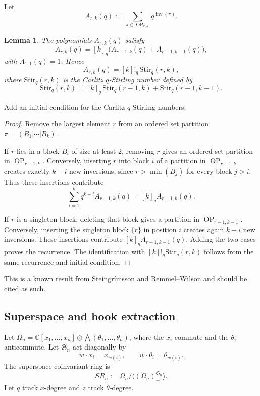 \documentclass[12pt]{article}
\newtheorem{lemma}[theorem]{Lemma}
\DeclareMathOperator{\Inv}{inv}
\DeclareMathOperator{\OP}{OP}
\newcommand{\C}{\mathbb{C}}
\newcommand{\Sn}{\mathfrak{S}_n}
\newcommand{\review}[1]{\begin{reviewbox}#1\end{reviewbox}}
\begin{document}
Let
\[
A_{r,k}(q):=\sum_{\pi\in \OP_{r,k}} q^{\Inv(\pi)}.
\]

\begin{lemma}
The polynomials \(A_{r,k}(q)\) satisfy
\[
A_{r,k}(q)=[k]_q\bigl(A_{r-1,k}(q)+A_{r-1,k-1}(q)\bigr),
\]
with \(A_{1,1}(q)=1\). Hence
\[
A_{r,k}(q)=[k]!_q\,\mathrm{Stir}_q(r,k),
\]
where \(\mathrm{Stir}_q(r,k)\) is the Carlitz \(q\)-Stirling number defined by
\[
\mathrm{Stir}_q(r,k)=[k]_q\,\mathrm{Stir}_q(r-1,k)+\mathrm{Stir}_q(r-1,k-1).
\]

\end{lemma}

\review{Add an initial condition for the Carlitz $q$-Stirling numbers.}

\begin{proof}
Remove the largest element \(r\) from an ordered set partition
\(\pi=(B_1|\cdots|B_k)\).

If \(r\) lies in a block \(B_i\) of size at least \(2\), removing \(r\) gives an
ordered set partition in \(\OP_{r-1,k}\). Conversely, inserting \(r\) into block
\(i\) of a partition in \(\OP_{r-1,k}\) creates exactly \(k-i\) new inversions,
since \(r>\min(B_j)\) for every block \(j>i\). Thus these insertions contribute
\[
\sum_{i=1}^k q^{k-i} A_{r-1,k}(q)=[k]_q A_{r-1,k}(q).
\]

If \(r\) is a singleton block, deleting that block gives a partition in
\(\OP_{r-1,k-1}\). Conversely, inserting the singleton block \(\{r\}\) in
position \(i\) creates again \(k-i\) new inversions. These insertions contribute
\([k]_q A_{r-1,k-1}(q)\). Adding the two cases proves the recurrence. The
identification with \([k]!_q\mathrm{Stir}_q(r,k)\) follows from the same recurrence
and initial condition.
\end{proof}

\review{This is a known result from Steingrímsson and Remmel--Wilson and should be cited as such.}

\subsection{Superspace and hook extraction}

Let \(\Omega_n=\C[x_1,\dots,x_n]\otimes \bigwedge(\theta_1,\dots,\theta_n)\), where
the \(x_i\) commute and the \(\theta_i\) anticommute. Let \(\Sn\) act diagonally by
\[
w\cdot x_i=x_{w(i)},\qquad w\cdot \theta_i=\theta_{w(i)}.
\]
The superspace coinvariant ring is
\[
SR_n:=\Omega_n/\langle(\Omega_n)^{\Sn}_+\rangle.
\]
Let \(q\) track \(x\)-degree and \(z\) track \(\theta\)-degree.
\end{document}
